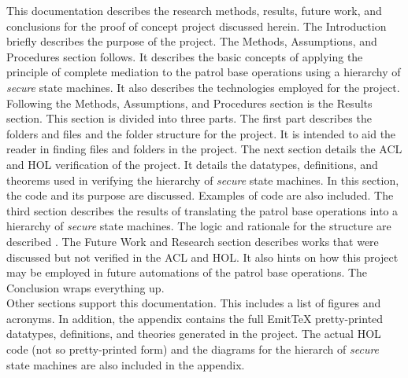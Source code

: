 This documentation describes the research methods, results, future work, and conclusions
for the proof of concept project discussed herein.   The Introduction briefly describes
the purpose of the project.  The Methods, Assumptions, and Procedures  section follows.
It describes the basic concepts of applying the principle of complete mediation to the
patrol base operations using a hierarchy of \emph{secure} state machines.  It also describes the
technologies employed for the project.  Following the Methods, Assumptions, and Procedures
section is the Results  section.   This section is divided into three parts.  The first
part describes the folders and files and the folder structure for the project.  It is intended
to aid the reader in finding files and folders in the project. The next section details the
ACL and HOL verification of the project.  It details the datatypes, definitions, and theorems
used in verifying the hierarchy of \emph{secure} state machines.  In this section, the code and its
purpose are discussed.  Examples of code are also included.  The third section describes the
results of translating the patrol base operations into a hierarchy of \emph{secure} state machines.
The logic and rationale for the structure are described .   The Future Work and Research
section describes works that were discussed but not verified in the ACL and HOL.  It also
hints on how this project may be employed in future automations of the patrol base operations.
The Conclusion wraps everything up.\\

Other sections support this documentation.  This includes a list of figures and acronyms.
In addition, the appendix contains the full EmitTeX pretty-printed datatypes, definitions,
and theories generated in the project.  The actual HOL code (not so pretty-printed form) and
the diagrams for the hierarch of \emph{secure} state machines are also included in the appendix.